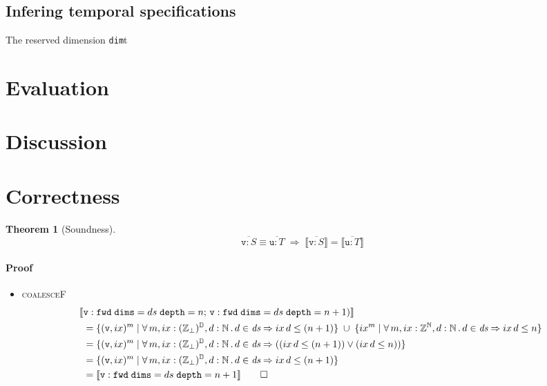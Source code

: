 \documentclass[9pt]{sigplanconf}
\newcounter{block}
\theoremstyle{definition}
\newtheorem{theorem}[block]{Theorem}
\newcommand{\dimId}{\texttt{dim}}
\newcommand{\interp}[1]{\llbracket{#1}\rrbracket}
\begin{document}

\subsection{Infering temporal specifications}

The reserved dimension \dimId{t}

\section{Evaluation}
\label{sec:evaluation}

\section{Discussion}
\label{sec:discussion}





\onecolumn
\appendix

\section{Correctness}


\begin{theorem}[Soundness]
\[
\overline{\texttt{v} : S}\equiv \overline{\texttt{u} : T}
\; \Rightarrow \;
\interp{\overline{\texttt{v} : S}} = \interp{\overline{\texttt{u} : T}}
\]
\end{theorem}

\paragraph{Proof}
\begin{itemize}
\item \textsc{coalesceF}
\begin{align*}
\llbracket & \texttt{v} : \texttt{fwd} \; \texttt{dims}=ds \; \texttt{depth}=n; \,
  \texttt{v} :  \texttt{fwd} \; \texttt{dims}=ds \;
  \texttt{depth}=n+1)\rrbracket \\
& =  \{ (\texttt{v}, ix)^m \mid \forall \, m, ix : \relix, d : \mathbb{N}
  \, . \, d \in \textit{ds} \Rightarrow ix \, d \leq (n+1) \} \; \cup \; \{ ix^m \mid \forall \, m, ix : \mathbb{Z}^{\mathbb{N}}, d : \mathbb{N}
  \, . \, d \in \textit{ds} \Rightarrow ix \, d \leq n \}\\
& =  \{ (\texttt{v}, ix)^m \mid \forall \, m, ix : \relix, d : \mathbb{N}
  \, . \, d \in \textit{ds} \Rightarrow ((ix \, d \leq (n+1)) \vee (ix \,
  d \leq n)) \} \\
& =  \{ (\texttt{v}, ix)^m \mid \forall \, m, ix : \relix, d : \mathbb{N}
  \, . \, d \in \textit{ds} \Rightarrow ix \, d \leq (n+1) \} \\
& = \interp{\texttt{v} : \texttt{fwd} \; \texttt{dims}=ds \;
  \texttt{depth}=n + 1} \qquad \Box
\end{align*}
\end{itemize}
\end{document}

